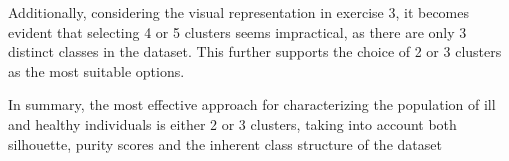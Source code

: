 \documentclass[12pt]{article}
\begin{document}
\begin{enumerate}[leftmargin=\labelsep]
         Additionally, considering the visual representation in exercise 3, it becomes evident that selecting 4 or 5 clusters seems impractical, 
          as there are only 3 distinct classes in the dataset. This further supports the choice of 2 or 3 clusters as the most suitable options. 
        
        In summary, the most effective approach for characterizing the population of ill and healthy individuals is either 2 or 3 clusters, taking into
         account both silhouette, purity scores and the inherent class structure of the dataset
\end{enumerate}
\end{document}
